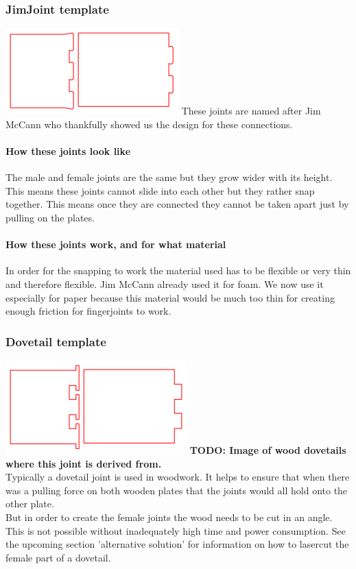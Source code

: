 \documentclass[../ClassicThesis.tex]{subfiles}
\begin{document}
\subsubsection{JimJoint template}
    \includegraphics[width=0.5\columnwidth]{Images/jimjoints.png}
    These joints are named after Jim McCann who thankfully showed us the design for these connections.
    \paragraph{How these joints look like}
    The male and female joints are the same but they grow wider with its height. This means these joints cannot slide into each other but they rather snap together. This means once they are connected they cannot be taken apart just by pulling on the plates. 
    \paragraph{How these joints work, and for what material}
    In order for the snapping to work the material used has to be flexible or very thin and therefore flexible. Jim McCann already used it for foam. We now use it especially for paper because this material would be much too thin for creating enough friction for fingerjoints to work.

\subsubsection{Dovetail template}
    \includegraphics[width=0.5\columnwidth]{Images/schwalbe.png}
    \textbf{TODO: Image of wood dovetails where this joint is derived from.}\\
    Typically a dovetail joint is used in woodwork. It helps to ensure that when there was a pulling force on both wooden plates that the joints would all hold onto the other plate.\\
    But in order to create the female joints the wood needs to be cut in an angle. This is not possible without inadequately high time and power consumption. See the upcoming section 'alternative solution' for information on how to lasercut the female part of a dovetail.
\end{document}
